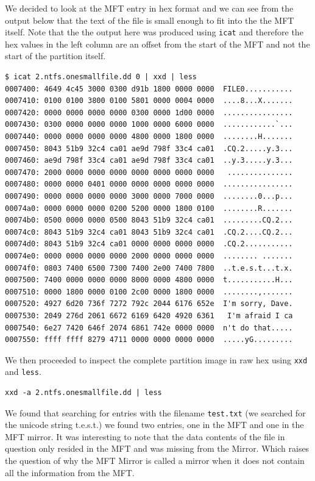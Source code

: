 \documentclass[a4paper,
    11pt,
    normalheadings,
    parindent,
    UKenglish,
    abstracton,
    ]{scrartcl}
\begin{document}
We decided to look at the MFT entry in hex format and we can see from the output below that the text of the file is small enough to fit into the the MFT itself. Note that the the output here was produced using \texttt{icat} and therefore the hex values in the left column are an offset from the start of the MFT and not the start of the partition itself.
\begin{verbatim}
$ icat 2.ntfs.onesmallfile.dd 0 | xxd | less
0007400: 4649 4c45 3000 0300 d91b 1800 0000 0000  FILE0...........
0007410: 0100 0100 3800 0100 5801 0000 0004 0000  ....8...X.......
0007420: 0000 0000 0000 0000 0300 0000 1d00 0000  ................
0007430: 0300 0000 0000 0000 1000 0000 6000 0000  ............`...
0007440: 0000 0000 0000 0000 4800 0000 1800 0000  ........H.......
0007450: 8043 51b9 32c4 ca01 ae9d 798f 33c4 ca01  .CQ.2.....y.3...
0007460: ae9d 798f 33c4 ca01 ae9d 798f 33c4 ca01  ..y.3.....y.3...
0007470: 2000 0000 0000 0000 0000 0000 0000 0000   ...............
0007480: 0000 0000 0401 0000 0000 0000 0000 0000  ................
0007490: 0000 0000 0000 0000 3000 0000 7000 0000  ........0...p...
00074a0: 0000 0000 0000 0200 5200 0000 1800 0100  ........R.......
00074b0: 0500 0000 0000 0500 8043 51b9 32c4 ca01  .........CQ.2...
00074c0: 8043 51b9 32c4 ca01 8043 51b9 32c4 ca01  .CQ.2....CQ.2...
00074d0: 8043 51b9 32c4 ca01 0000 0000 0000 0000  .CQ.2...........
00074e0: 0000 0000 0000 0000 2000 0000 0000 0000  ........ .......
00074f0: 0803 7400 6500 7300 7400 2e00 7400 7800  ..t.e.s.t...t.x.
0007500: 7400 0000 0000 0000 8000 0000 4800 0000  t...........H...
0007510: 0000 1800 0000 0100 2c00 0000 1800 0000  ........,.......
0007520: 4927 6d20 736f 7272 792c 2044 6176 652e  I'm sorry, Dave.
0007530: 2049 276d 2061 6672 6169 6420 4920 6361   I'm afraid I ca
0007540: 6e27 7420 646f 2074 6861 742e 0000 0000  n't do that.....
0007550: ffff ffff 8279 4711 0000 0000 0000 0000  .....yG.........
\end{verbatim}


We then proceeded to inspect the complete partition image in raw hex using \texttt{xxd} and \texttt{less}.
\begin{verbatim}
xxd -a 2.ntfs.onesmallfile.dd | less
\end{verbatim}
We found that searching for entries with the filename \texttt{test.txt} (we searched for the unicode string t.e.s.t.) we found two entries, one in the MFT and one in the MFT mirror.  It was interesting to note that the data contents of the file in question only resided in the MFT and was missing from the Mirror. Which raises the question of why the MFT Mirror is called a mirror when it does not contain all the information from the MFT.
\end{document}
